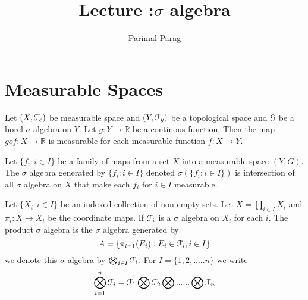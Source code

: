 \documentclass[a4paper,english,12pt]{article}
\title{Lecture :$\sigma$ algebra}
\author{Parimal Parag}
\begin{document}
\maketitle

\section{Measurable Spaces}
\begin{cor}
Let $(X,\mathcal{F}_c)$ be measurable space and $(Y,\mathcal{F}_y)$ be a topological space and $\mathcal{G}$ be a borel $\sigma$ algebra on $Y$. Let $g : Y \longrightarrow \mathbb{R}$ be a continous function. Then the map $ g o f : X \longrightarrow \mathbb{R}$ is measurable for each measurable function $f : X \longrightarrow Y$.
\end{cor}
	
\begin{defn} %
Let $\{f_i : i \in I\}$ be a family of maps from a set $X$ into a measurable space $(Y,G)$. The $\sigma$ algebra generated by $\{f_i : i \in I\}$ denoted $\sigma(\{f_i : i \in I\})$ is intersection of all $\sigma$ algebra on $X$ that make each $f_i$ for $i \in I$ measurable.	
	
\end{defn}	

\begin{defn} %
	Let $\{X_i : i \in I\}$ be an indexed collection of non empty sets. Let $X = \prod_{i\in I} X_i$ and $\pi_i : X \longrightarrow X_i$ be the coordinate maps. If $\mathcal{F}_i$ is a $\sigma$ algebra on $X_i$ for each $i$. The product $\sigma$ algebra is the $\sigma$ algebra generated by  \[A= \{\pi_{i^-1}(E_i) : E_i \in \mathcal{F}_i , i \in I\}\]  we denote this $\sigma$ algebra by $\bigotimes_{i\in I} \mathcal{F}_i$. For $I = \{1,2,.....n\}$ we write \[\bigotimes_{i=1}^{n} \mathcal{F}_i = \mathcal{F}_1 \bigotimes \mathcal{F}_2 \bigotimes ...... \bigotimes \mathcal{F}_n\] 
\end{defn}
\end{document}
